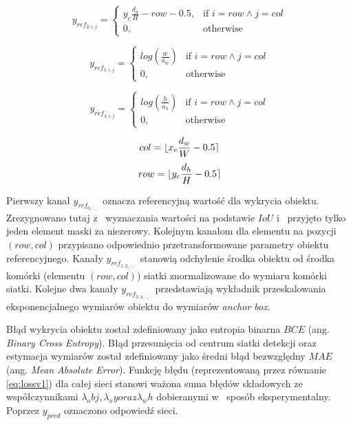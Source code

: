 \begin{equation}
y_{ref}_{2,i,j} = 
\begin{cases}
    y_c \frac{d_h}{H} - row - 0.5, & \text{if }  i = row \land j = col \\
    0,              & \text{otherwise}
\end{cases}
\label{eq:y_ref_yv1}
\end{equation}

\begin{equation}
y_{ref}_{3,i,j} = 
\begin{cases}
    log(\frac{w}{a_w}) & \text{if }  i = row \land j = col \\
    0,              & \text{otherwise}
\end{cases}
\label{eq:y_ref_wv1}
\end{equation}

\begin{equation}
y_{ref}_{4,i,j} = 
\begin{cases}
    log(\frac{h}{a_h}) & \text{if }  i = row \land j = col \\
    0,              & \text{otherwise}
\end{cases}
\label{eq:y_ref_hv1}
\end{equation}

\begin{equation}
col = \lfloor x_c \frac{d_w}{W} - 0.5\rceil
\label{eq:colv1}
\end{equation}
\begin{equation}
row = \lfloor y_c \frac{d_h}{H} - 0.5\rceil
\label{eq:rowv1}
\end{equation}


Pierwszy kanał $y_{ref}_{0,:,:}$ oznacza referencyjną wartość dla wykrycia obiektu.
Zrezygnowano tutaj z~ wyznaczania wartości na podstawie $IoU$ i~ przyjęto tylko jeden element maski za niezerowy. 
Kolejnym kanałom dla elementu na pozycji $(row, col)$ przypisano odpowiednio przetransformowane parametry obiektu referencyjnego. Kanały $y_{ref}_{1:2,:,:}$ stanowią odchylenie środka obiektu od środka komórki (elementu $(row, col)$) siatki znormalizowane do wymiaru komórki siatki.
Kolejne dwa kanały $y_{ref}_{3:4,:,:}$ przedstawiają wykładnik przeskalowania eksponencjalnego wymiarów obiektu do wymiarów \emph{anchor box}.

Błąd wykrycia obiektu został zdefiniowany jako entropia binarna $BCE$ (ang. \emph{Binary Cross Entropy}). 
Błąd przesunięcia od centrum siatki detekcji oraz estymacja wymiarów został zdefiniowany jako średni błąd bezwzględny $MAE$ (ang. \emph{Mean Absolute Error}).
Funkcję błędu (reprezentowaną przez równanie \eqref{eq:lossv1}) dla całej sieci stanowi ważona suma błędów składowych ze współczynnikami $\lambda_obj, \lambda_xy oraz \lambda_wh$ dobieranymi w~ sposób eksperymentalny. 
Poprzez $y_{pred}$ oznaczono odpowiedź sieci. 

